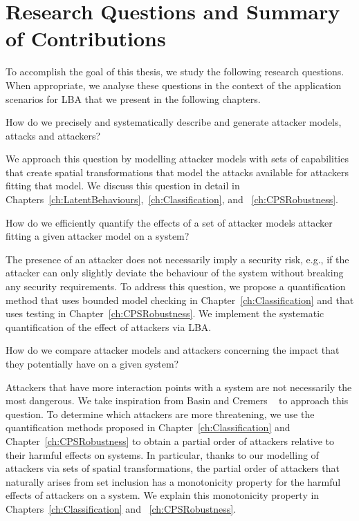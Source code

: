 \section{Research Questions and Summary of Contributions}
\label{sec:Introduction:ResearchQuestions}
To accomplish the goal of this thesis, we study the following research questions. When appropriate, we analyse these questions in the context of the application scenarios for LBA that we present in the following chapters. 
\begin{question}
\label{que:AttackerModel}
How do we precisely and systematically describe and generate attacker models, attacks and attackers?
\end{question}
We approach this question by modelling attacker models with sets of capabilities that create spatial transformations that model the attacks available for attackers fitting that model. We discuss this question in detail in Chapters~\ref{ch:LatentBehaviours},~\ref{ch:Classification}, and ~\ref{ch:CPSRobustness}.
\begin{question} 
\label{que:Quantification}
How do we efficiently quantify the effects of a set of attacker models attacker fitting a given attacker model on a system? 
\end{question}
The presence of an attacker does not necessarily imply a security risk, e.g., if the attacker can only slightly deviate the behaviour of the system without breaking any security requirements. To address this question, we propose a quantification method that uses bounded model checking in Chapter~\ref{ch:Classification} and that uses testing in Chapter~\ref{ch:CPSRobustness}. We implement the systematic quantification of the effect of attackers via LBA. 

\begin{question}
\label{que:Classification}
How do we compare attacker models and attackers concerning the impact that they potentially have on a given system?
\end{question}
Attackers that have more interaction points with a system are not necessarily the most dangerous. We take inspiration from Basin and Cremers ~\cite{KnowYourEnemy} to approach this question. To determine which attackers are more threatening, we use the quantification methods proposed in Chapter~\ref{ch:Classification} and Chapter~\ref{ch:CPSRobustness} to obtain a partial order of attackers relative to their harmful effects on systems. In particular, thanks to our modelling of attackers via sets of spatial transformations, the partial order of attackers that naturally arises from set inclusion has a monotonicity property for the harmful effects of attackers on a system. We explain this monotonicity property in Chapters~\ref{ch:Classification} and ~\ref{ch:CPSRobustness}.

